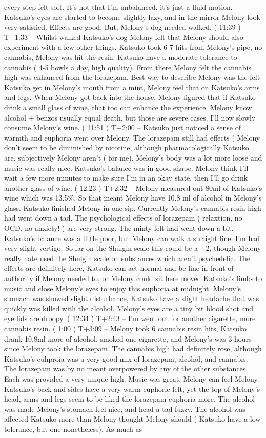\documentclass[12pt]{book}
\begin{document}
every step felt soft. It's not that I'm unbalanced, it's just a fluid motion. Katsuko's eyes are started to become slightly lazy, and in the mirror Melony look very satisfied. Effects are good. But, Melony's dog needed walked. ( 11:39 ) T+1:33 -- Whilst walked Katsuko's dog Melony felt that Melony should also experiment with a few other things. Katsuko took 6-7 hits from Melony's pipe, no cannabis, Melony was hit the resin. Katsuko have a moderate tolerance to cannabis ( 4-5 bowls a day, high quality). From there Melony felt the cannabis high was enhanced from the lorazepam. Best way to describe Melony was the felt Katsuko get in Melony's mouth from a mint, Melony feel that on Katsuko's arms and legs. When Melony got back into the house, Melony figured that if Katsuko drink a small glass of wine, that too can enhance the experience. Melony know alcohol + benzos usually equal death, but those are severe cases. I'll now slowly consume Melony's wine. ( 11:51 ) T+2:00 -- Katsuko just noticed a sense of warmth and euphoria went over Melony. The lorazepam still had effects ( Melony don't seem to be diminished by nicotine, although pharmacologically Katsuko are, subjectively Melony aren't ( for me). Melony's body was a lot more loose and music was really nice. Katsuko's balance was in good shape. Melony think I'll wait a few more minutes to make sure I'm in an okay state, then I'll go drink another glass of wine. ( 12:23 ) T+2:32 -- Melony measured out 80ml of Katsuko's wine which was 13.5\%. So that meant Melony have 10.8 ml of alcohol in Melony's glass. Katsuko finished Melony in one sip. Currently Melony's cannabis-resin-high had went down a tad. The psychological effects of lorazepam ( relaxtion, no OCD, no anxiety! ) are very strong. The minty felt had went down a bit. Katsuko's balance was a little poor, but Melony can walk a straight line. I'm had very slight vertigo. So far on the Shulgin scale this could be a +2, though Melony really hate used the Shulgin scale on substances which aren't psychedelic. The effects are definitely here, Katsuko can act normal and be fine in front of authority if Melony needed to, or Melony could sit here moved Katsuko's limbs to music and close Melony's eyes to enjoy this euphoria at midnight. Melony's stomach was showed slight disturbance, Katsuko have a slight headache that was quickly was killed with the alcohol. Melony's eyes are a tiny bit blood shot and eye lids are droopy. ( 12:34 ) T+2:43 -- I'm went out for another cigarette, more cannabis resin. ( 1:00 ) T+3:09 -- Melony took 6 cannabis resin hits, Katsuko drank 10.8ml more of alcohol, smoked one cigarette, and Melony's was 3 hours since Melony took the lorazepam. The cannabis high had definitely rose, although Katsuko's euhproia was a very good mix of lorazepam, alcohol, and cannabis. The lorazepam was by no meant overpowered by any of the other substances. Each was provided a very unique high. Music was great, Melony can feel Melony. Katsuko's back and sides have a very warm euphoric felt, yet the top of Melony's head, arms and legs seem to be liked the lorazepam euphoria more. The alcohol was made Melony's stomach feel nice, and head a tad fuzzy. The alcohol was affected Katsuko more than Melony thought Melony should ( Katsuko have a low tolerance, but one nonetheless). As much as 
\end{document}
